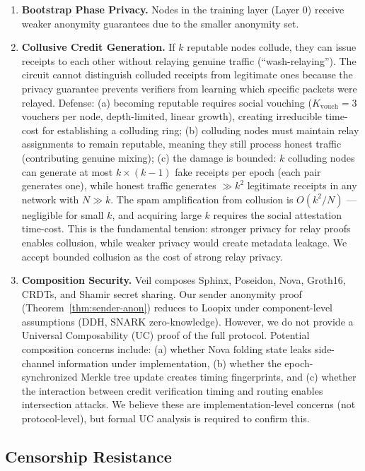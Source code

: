 \documentclass[11pt,a4paper]{article}
\begin{document}
\begin{enumerate}
    \item \textbf{Bootstrap Phase Privacy.} Nodes in the training layer (Layer 0) receive weaker anonymity guarantees due to the smaller anonymity set.

    \item \textbf{Collusive Credit Generation.} If $k$ reputable nodes collude, they can issue receipts to each other without relaying genuine traffic (``wash-relaying''). The circuit cannot distinguish colluded receipts from legitimate ones because the privacy guarantee prevents verifiers from learning which specific packets were relayed. Defense: (a) becoming reputable requires social vouching ($K_{\text{vouch}} = 3$ vouchers per node, depth-limited, linear growth), creating irreducible time-cost for establishing a colluding ring; (b) colluding nodes must maintain relay assignments to remain reputable, meaning they still process honest traffic (contributing genuine mixing); (c) the damage is bounded: $k$ colluding nodes can generate at most $k \times (k-1)$ fake receipts per epoch (each pair generates one), while honest traffic generates $\gg k^2$ legitimate receipts in any network with $N \gg k$. The spam amplification from collusion is $O(k^2/N)$ --- negligible for small $k$, and acquiring large $k$ requires the social attestation time-cost. This is the fundamental tension: stronger privacy for relay proofs enables collusion, while weaker privacy would create metadata leakage. We accept bounded collusion as the cost of strong relay privacy.

    \item \textbf{Composition Security.} Veil composes Sphinx, Poseidon, Nova, Groth16, CRDTs, and Shamir secret sharing. Our sender anonymity proof (Theorem~\ref{thm:sender-anon}) reduces to Loopix under component-level assumptions (DDH, SNARK zero-knowledge). However, we do not provide a Universal Composability (UC) proof of the full protocol. Potential composition concerns include: (a) whether Nova folding state leaks side-channel information under implementation, (b) whether the epoch-synchronized Merkle tree update creates timing fingerprints, and (c) whether the interaction between credit verification timing and routing enables intersection attacks. We believe these are implementation-level concerns (not protocol-level), but formal UC analysis is required to confirm this.
\end{enumerate}

\subsection{Censorship Resistance}
\label{sec:censorship}
\end{document}

